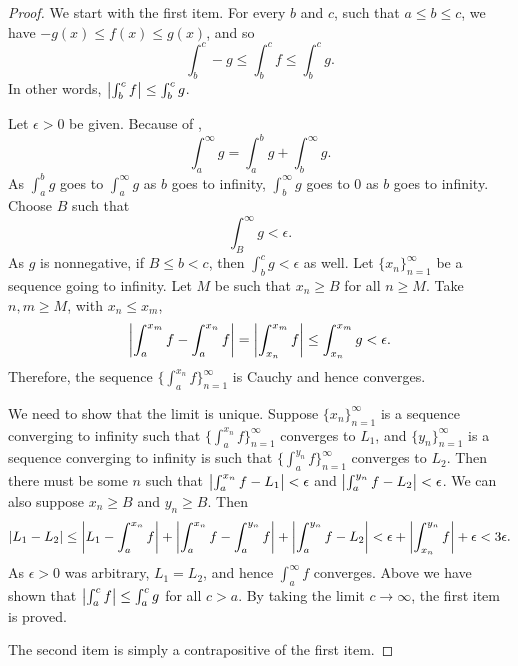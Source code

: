 \begin{proof}
We start with the first item.
For every $b$ and $c$, such that $a \leq b \leq c$, we have 
$-g(x) \leq f(x) \leq g(x)$, and so
\begin{equation*}
\int_b^c -g \leq \int_b^c f \leq \int_b^c g  .
\end{equation*}
In other words, $\left\lvert {\int_b^c f} \right\rvert \leq \int_b^c g$.

Let $\epsilon > 0$ be given.  Because
of ,
\begin{equation*}
\int_a^\infty g =
\int_a^b g +
\int_b^\infty g .
\end{equation*}
As $\int_a^b g$ goes to
$\int_a^\infty g$ as $b$ goes to infinity,
$\int_b^\infty g$ goes to 0 as $b$ goes to infinity.  Choose $B$
such that
\begin{equation*}
\int_B^\infty g < \epsilon .
\end{equation*}
As $g$ is nonnegative, if $B \leq b < c$, then
$\int_b^c g < \epsilon$ as well.
Let $\{ x_n \}_{n=1}^\infty$ be a sequence going to infinity.  Let $M$ be such that
$x_n \geq B$ for all $n \geq M$.  Take $n, m \geq M$,
with $x_n \leq x_m$,
\begin{equation*}
\left\lvert {\int_a^{x_m} f - \int_a^{x_n} f} \right\rvert 
=
\left\lvert {\int_{x_n}^{x_m} f} \right\rvert 
\leq \int_{x_n}^{x_m} g < \epsilon .
\end{equation*}
Therefore, the sequence $\bigl\{ \int_a^{x_n} f \bigr\}_{n=1}^\infty$ is Cauchy and hence converges.

We need to show that the limit is unique.  Suppose $\{ x_n \}_{n=1}^\infty$ is a sequence
converging to infinity such that
$\bigl\{ \int_a^{x_n} f \bigr\}_{n=1}^\infty$ converges to $L_1$, and $\{
y_n \}_{n=1}^\infty$ is a sequence
converging to infinity is such that
$\bigl\{ \int_a^{y_n} f \bigr\}_{n=1}^\infty$ converges to $L_2$.  Then there must be some $n$ such
that
$\bigl\lvert {\int_a^{x_n} f - L_1} \bigr\rvert < \epsilon$ and 
$\bigl\lvert {\int_a^{y_n} f - L_2} \bigr\rvert < \epsilon$.  We can also suppose $x_n \geq B$
and $y_n \geq B$.  Then
\begin{equation*}
\left\lvert {L_1 - L_2} \right\rvert \leq
\left\lvert {L_1 - \int_a^{x_n} f} \right\rvert
+
\left\lvert {\int_a^{x_n} f- \int_a^{y_n} f} \right\rvert
+
\left\lvert {\int_a^{y_n} f - L_2} \right\rvert
<
\epsilon
+
\left\lvert {\int_{x_n}^{y_n} f} \right\rvert
+
\epsilon
<
3 \epsilon.
\end{equation*}
As $\epsilon > 0$ was arbitrary, $L_1 = L_2$, and hence
$\int_a^\infty f$ converges.
Above we have shown that $\left\lvert {\int_a^c f} \right\rvert \leq \int_a^c g$ for all $c > a$.
By taking the limit $c \to \infty$, the first item is proved.

The second item is simply a contrapositive of the first item.
\end{proof}

